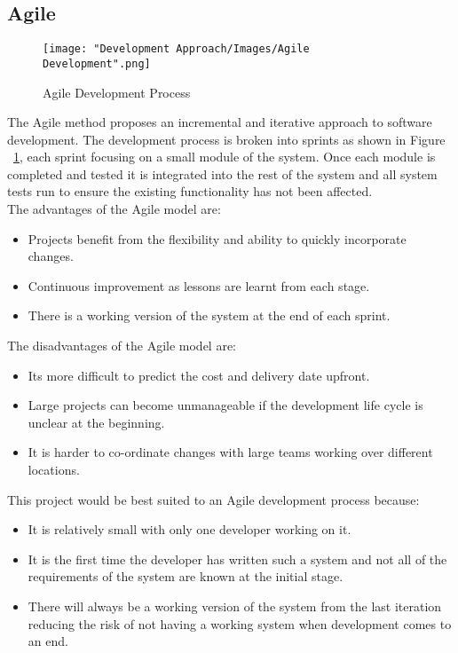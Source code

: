 	\subsection{Agile}
		\begin{figure}[htp]
			\centering
			\texttt{[image: "Development Approach/Images/Agile Development".png]}
			\caption{Agile Development Process}
    			\label{fig:agileMethod}
		\end{figure}		
	
	The Agile method proposes an incremental and iterative approach to software development. The development process is broken into sprints as shown in Figure ~\ref{fig:agileMethod}, each sprint focusing on a small module of the system. Once each module is completed and tested it is integrated into the rest of the system and all system tests run to ensure the existing functionality has not been affected.\\
	
	The advantages of the Agile model are:
	\begin{itemize}
		\item Projects benefit from the flexibility and ability to quickly incorporate changes.
		\item Continuous improvement as lessons are learnt from each stage.
		\item There is a working version of the system at the end of each sprint.
	\end{itemize}		
	
	The disadvantages of the Agile model are:
	\begin{itemize}
		\item Its more difficult to predict the cost and delivery date upfront.
		\item Large projects can become unmanageable if the development life cycle is unclear at the beginning.
		\item It is harder to co-ordinate changes with large teams working over different locations.
	\end{itemize}
	
	This project would be best suited to an Agile development process because:
	\begin{itemize}
		\item It is relatively small with only one developer working on it.
		\item It is the first time the developer has written such a system and not all of the requirements of the system are known at the initial stage.
		\item There will always be a working version of the system from the last iteration reducing the risk of not having a working system when development comes to an end.
	\end{itemize}
	
